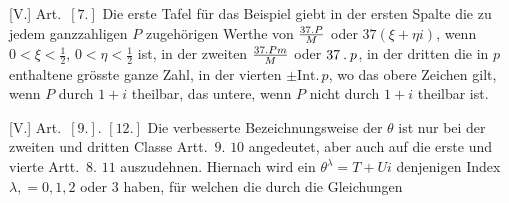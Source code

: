 [V.] Art.\ $[7.]$ Die erste Tafel für das Beispiel giebt in der ersten Spalte die zu jedem ganzzahligen $P$ zugehörigen Werthe von $\frac{37\mathbin{.} P}{M}$ oder $37(\xi+\eta i)$, wenn $0<\xi<\tfrac12$, $0<\eta<\tfrac12$ ist, in der zweiten $\frac{37\mathbin{.} Pm}{M}$ oder $37\mathbin{.} p$, in der dritten die in $p$ enthaltene grösste ganze Zahl, in der vierten $\pm\mathrm{Int.}\,p$, wo das obere Zeichen gilt, wenn $P$ durch $1+i$ theilbar, das untere, wenn $P$ nicht durch $1+i$ theilbar ist.

[V.] Art.\ $[9.]$. $[12.]$ Die verbesserte Bezeichnungsweise der $\theta$ ist nur bei der zweiten und dritten Classe Artt.\ $9$. $10$ angedeutet, aber auch auf die erste und vierte Artt.\ $8$. $11$ auszudehnen. Hiernach wird ein $\theta^\lambda=T+Ui$ denjenigen Index $\lambda,=0,1,2$ oder $3$ haben, für welchen die durch die Gleichungen

